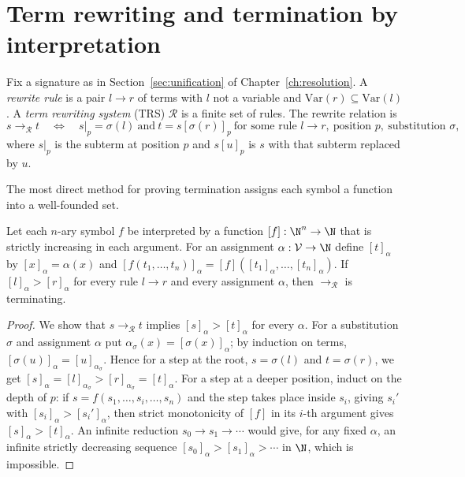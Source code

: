 \section{Term rewriting and termination by interpretation}
\label{sec:trs}

Fix a signature as in Section~\ref{sec:unification} of Chapter~\ref{ch:resolution}. A \emph{rewrite rule} is a pair $l\to r$ of terms with $l$ not a variable and $\mathrm{Var}(r)\subseteq\mathrm{Var}(l)$. A \emph{term rewriting system} (TRS) $\mathcal{R}$ is a finite set of rules. The rewrite relation is
\[
s\to_{\mathcal{R}}t\quad\Longleftrightarrow\quad s|_p=\sigma(l)\ \text{and}\ t=s[\sigma(r)]_p\ \text{for some rule } l\to r,\ \text{position } p,\ \text{substitution }\sigma,
\]
where $s|_p$ is the subterm at position $p$ and $s[u]_p$ is $s$ with that subterm replaced by $u$.

The most direct method for proving termination assigns each symbol a function into a well-founded set.

\begin{proposition}
\label{prop:interp}
Let each $n$-ary symbol $f$ be interpreted by a function $[f]:\N^n\to\N$ that is strictly increasing in each argument. For an assignment $\alpha:\mathcal{V}\to\N$ define $[t]_\alpha$ by $[x]_\alpha=\alpha(x)$ and $[f(t_1,\dots,t_n)]_\alpha=[f]([t_1]_\alpha,\dots,[t_n]_\alpha)$. If $[l]_\alpha>[r]_\alpha$ for every rule $l\to r$ and every assignment $\alpha$, then $\to_{\mathcal{R}}$ is terminating.
\end{proposition}

\begin{proof}
We show that $s\to_{\mathcal{R}}t$ implies $[s]_\alpha>[t]_\alpha$ for every $\alpha$. For a substitution $\sigma$ and assignment $\alpha$ put $\alpha_\sigma(x)=[\sigma(x)]_\alpha$; by induction on terms, $[\sigma(u)]_\alpha=[u]_{\alpha_\sigma}$. Hence for a step at the root, $s=\sigma(l)$ and $t=\sigma(r)$, we get $[s]_\alpha=[l]_{\alpha_\sigma}>[r]_{\alpha_\sigma}=[t]_\alpha$. For a step at a deeper position, induct on the depth of $p$: if $s=f(s_1,\dots,s_i,\dots,s_n)$ and the step takes place inside $s_i$, giving $s_i'$ with $[s_i]_\alpha>[s_i']_\alpha$, then strict monotonicity of $[f]$ in its $i$-th argument gives $[s]_\alpha>[t]_\alpha$. An infinite reduction $s_0\to s_1\to\cdots$ would give, for any fixed $\alpha$, an infinite strictly decreasing sequence $[s_0]_\alpha>[s_1]_\alpha>\cdots$ in $\N$, which is impossible.
\end{proof}

